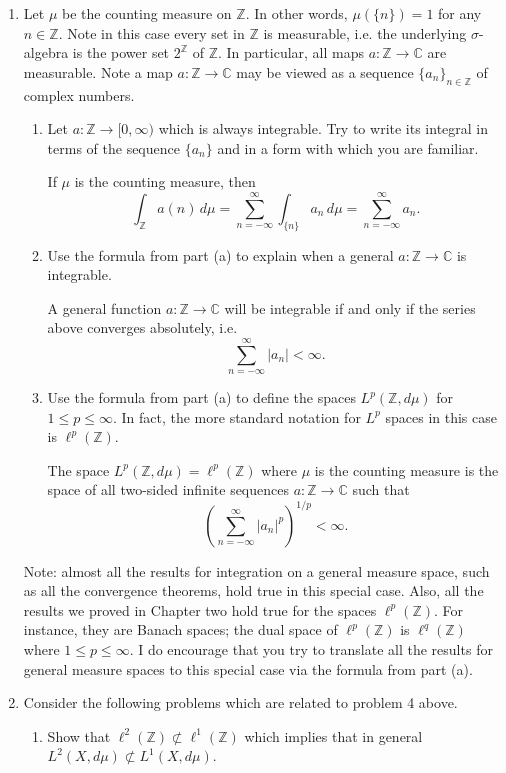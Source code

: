 \documentclass[11pt,oneside,english]{amsart}
\theoremstyle{definition}
\newcommand{\MB}[1]{\mathbb{#1}}
\begin{document}
\begin{enumerate}
\item Let $\mu$ be the counting measure on $\MB{Z}$. In other words, $\mu(\{n\})=1$ for any $n\in\MB{Z}$. Note in this case every set in $\MB{Z}$ is measurable, i.e. the underlying $\sigma$-algebra is the power set $2^{\MB{Z}}$ of $\MB{Z}$. In particular, all maps $a:\MB{Z}\to\MB{C}$ are measurable. Note a map $a:\MB{Z}\to\MB{C}$ may be viewed as a sequence $\{a_n\}_{n\in\MB{Z}}$ of complex numbers.
\begin{enumerate}
\item Let $a:\MB{Z}\to[0,\infty)$ which is always integrable. Try to write its integral in terms of the sequence $\{a_n\}$ and in a form with which you are familiar.

If $\mu$ is the counting measure, then
\[
\int_\MB{Z}a(n)\,d\mu=\sum_{n=-\infty}^\infty\int_{\{n\}}a_n\,d\mu=\sum_{n=-\infty}^\infty a_n.
\]
\item Use the formula from part (a) to explain when a general $a:\MB{Z}\to\MB{C}$ is integrable.

A general function $a:\MB{Z}\to\MB{C}$ will be integrable if and only if the series above converges absolutely, i.e.
\[
\sum_{n=-\infty}^\infty |a_n|<\infty.
\]
\item Use the formula from part (a) to define the spaces $L^p(\MB{Z},d\mu)$ for $1\leq p\leq \infty$. In fact, the more standard notation for $L^p$ spaces in this case is $\ell^p(\MB{Z})$.

The space $L^p(\MB{Z},d\mu)=\ell^p(\MB{Z})$ where $\mu$ is the counting measure is the space of all two-sided infinite sequences $a:\MB{Z}\to\MB{C}$ such that 
\[
\left(\sum_{n=-\infty}^\infty |a_n|^p\right)^{1/p}<\infty.
\]
\end{enumerate}

Note: almost all the results for integration on a general measure space, such as all the convergence theorems, hold true in this special case. Also, all the results we proved in Chapter two hold true for the spaces $\ell^p(\MB{Z})$. For instance, they are Banach spaces; the dual space of $\ell^p(\MB{Z})$ is $\ell^q(\MB{Z})$ where $1\leq p\leq \infty$. I do encourage that you try to translate all the results for general measure spaces to this special case via the formula from part (a).

\item Consider the following problems which are related to problem 4 above. 
\begin{enumerate}
\item Show that $\ell^2(\MB{Z})\not\subset\ell^1(\MB{Z})$ which implies that in general $L^2(X,d\mu)\not\subset L^1(X,d\mu)$.


\end{enumerate}
\end{enumerate}
\end{document}

